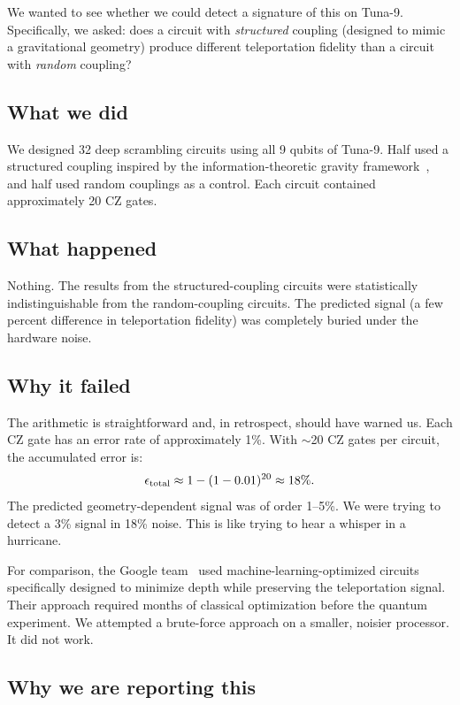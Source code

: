 \documentclass[amsmath,amssymb,reprint,aps,prb]{revtex4-2}
\begin{document}
We wanted to see whether we could detect a signature of this on
Tuna-9.  Specifically, we asked: does a circuit with
\emph{structured} coupling (designed to mimic a gravitational
geometry) produce different teleportation fidelity than a circuit
with \emph{random} coupling?

\subsection{What we did}

We designed 32 deep scrambling circuits using all 9 qubits of
Tuna-9.  Half used a structured coupling inspired by the
information-theoretic gravity framework~\cite{Huang2026}, and half
used random couplings as a control.  Each circuit contained
approximately 20 CZ gates.

\subsection{What happened}

Nothing.  The results from the structured-coupling circuits were
statistically indistinguishable from the random-coupling circuits.
The predicted signal (a few percent difference in teleportation
fidelity) was completely buried under the hardware noise.

\subsection{Why it failed}

The arithmetic is straightforward and, in retrospect, should have
warned us.  Each CZ gate has an error rate of approximately 1\%.
With $\sim$20 CZ gates per circuit, the accumulated error is:
\begin{equation}
\epsilon_{\rm total} \approx 1 - (1 - 0.01)^{20} \approx 18\%.
\end{equation}
The predicted geometry-dependent signal was of order 1--5\%.  We
were trying to detect a 3\% signal in 18\% noise.  This is like
trying to hear a whisper in a hurricane.

For comparison, the Google team~\cite{Jafferis2022} used
machine-learning-optimized circuits specifically designed to
minimize depth while preserving the teleportation signal.  Their
approach required months of classical optimization before the
quantum experiment.  We attempted a brute-force approach on a
smaller, noisier processor.  It did not work.

\subsection{Why we are reporting this}
\end{document}

